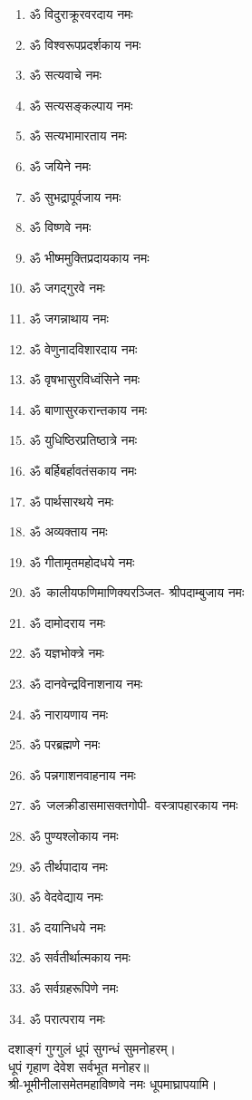 \begin{multicols}{2}
\begin{enumerate}
\item ॐ विदुराक्रूरवरदाय नमः
\item ॐ विश्वरूपप्रदर्शकाय नमः
\item ॐ सत्यवाचे नमः
\item ॐ सत्यसङ्कल्पाय नमः
\item ॐ सत्यभामारताय नमः
\item ॐ जयिने नमः
\item ॐ सुभद्रापूर्वजाय नमः
\item ॐ विष्णवे नमः
\item ॐ भीष्ममुक्तिप्रदायकाय नमः
\item ॐ जगद्गुरवे नमः
\item ॐ जगन्नाथाय नमः
\item ॐ वेणुनादविशारदाय नमः
\item ॐ वृषभासुरविध्वंसिने नमः
\item ॐ बाणासुरकरान्तकाय नमः
\item ॐ युधिष्ठिरप्रतिष्ठात्रे नमः
\item ॐ बर्हिबर्हावतंसकाय नमः
\item ॐ पार्थसारथये नमः
\item ॐ अव्यक्ताय नमः
\item ॐ गीतामृतमहोदधये नमः
\item \mbox{ॐ~कालीयफणिमाणिक्यरञ्जित-} श्रीपदाम्बुजाय नमः
\item ॐ दामोदराय नमः
\item ॐ यज्ञभोक्त्रे नमः
\item ॐ दानवेन्द्रविनाशनाय नमः
\item ॐ नारायणाय नमः
\item ॐ परब्रह्मणे नमः
\item ॐ पन्नगाशनवाहनाय नमः
\item \mbox{ॐ जलक्रीडासमासक्तगोपी-} वस्त्रापहारकाय नमः
\item ॐ पुण्यश्लोकाय नमः
\item ॐ तीर्थपादाय  नमः
\item ॐ वेदवेद्याय नमः
\item ॐ दयानिधये नमः
\item ॐ सर्वतीर्थात्मकाय नमः
\item ॐ सर्वग्रहरूपिणे नमः
\item ॐ परात्पराय नमः
\end{enumerate}
\end{multicols}
  
दशाङ्गं गुग्गुलं धूपं सुगन्धं सुमनोहरम्।\\
धूपं गृहाण देवेश सर्वभूत मनोहर॥ \\
श्री-भूमीनीलासमेतमहाविष्णवे नमः धूपमाघ्रापयामि।\\
 
